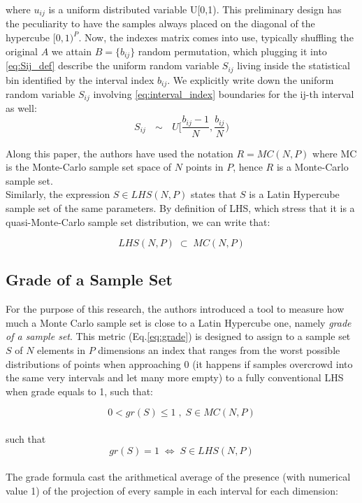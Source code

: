 \documentclass[12pt]{extarticle}
\newcommand{\meqref}[1]{Eq.\ref{#1}}
\begin{document}
where $u_{ij}$ is a uniform distributed variable U[0,1). This preliminary design has the peculiarity to have the samples always placed on the diagonal of the hypercube $[0,1)^P$. Now, the indexes matrix comes into use, typically shuffling the original $A$ we attain $B = \{b_{ij}\}$ random permutation, which plugging it  into \cref{eq:Sij_def} describe the uniform random variable $S_{ij}$ living inside the statistical bin identified by the interval index $b_{ij}$. We explicitly write down the uniform random variable $S_{ij}$ involving \cref{eq:interval_index} boundaries for the ij-th interval as well: 
\begin{equation}
\label{eq:rand_variable_Sij}
S_{ij} \text{ $\sim$ } U\Big[\frac{b_{ij} - 1}{N}, \frac{b_{ij}}{N}\Big)
\end{equation}

Along this paper, the authors have used the notation $R = MC(N, P)$ where MC is the Monte-Carlo sample set space of $N$ points in $P$, hence $R$ is a Monte-Carlo sample set. \\
Similarly, the expression $S \in LHS(N, P)$ states that $S$ is a Latin Hypercube sample set of the same parameters.
By definition of LHS, which stress that it is a quasi-Monte-Carlo sample set distribution, we can write that:

\begin{equation*}
LHS(N, P) \; \subset \; MC(N, P)
\end{equation*}

\subsection{Grade of a Sample Set}
\label{subsec:lhs_grade}
For the purpose of this research, the authors introduced a tool to measure how much a Monte Carlo sample set is close to a Latin Hypercube one, namely \textit{grade of a sample set}. This metric (\meqref{eq:grade}) is designed to assign to a sample set $S$ of $N$ elements in $P$ dimensions an index that ranges from the worst possible distributions of points when approaching 0 (it happens if samples overcrowd into the same very intervals and let many more empty) to a fully conventional LHS when grade equals to 1, such that:

\begin{equation}
\label{eq:grade_range}
0 < gr(S) \leq 1 \;,\; S \in MC(N,P)
\end{equation}
\\
such that
\\
\begin{equation}
\label{eq:grade_of_lhs}
gr(S) = 1 \;\Leftrightarrow \; S \in LHS(N, P)
\end{equation}
\\
The grade formula cast the arithmetical average of the presence (with numerical value 1) of the projection of every sample in each interval for each dimension:
\end{document}
